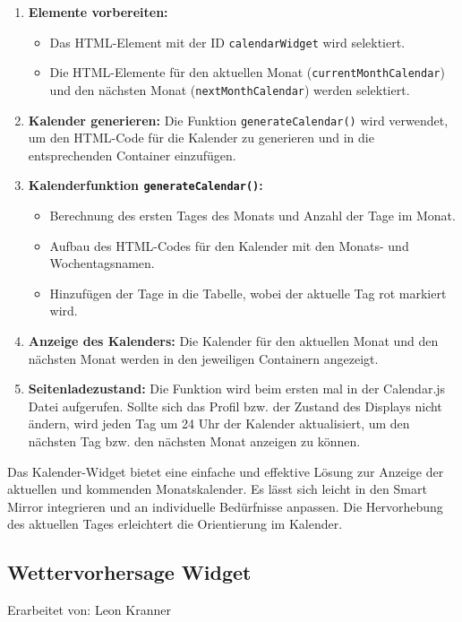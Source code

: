 \begin{enumerate}
    \item \textbf{Elemente vorbereiten:}
    \begin{itemize}
        \item Das HTML-Element mit der ID \texttt{calendarWidget} wird selektiert.
        \item Die HTML-Elemente für den aktuellen Monat (\texttt{currentMonthCalendar}) und den nächsten Monat (\texttt{nextMonthCalendar}) werden selektiert.
    \end{itemize}

    \item \textbf{Kalender generieren:}
    Die Funktion \texttt{generateCalendar()} wird verwendet, um den HTML-Code für die Kalender zu generieren und in die entsprechenden Container einzufügen.
    
    \item \textbf{Kalenderfunktion \texttt{generateCalendar()}:}
    \begin{itemize}
        \item Berechnung des ersten Tages des Monats und Anzahl der Tage im Monat.
        \item Aufbau des HTML-Codes für den Kalender mit den Monats- und Wochentagsnamen.
        \item Hinzufügen der Tage in die Tabelle, wobei der aktuelle Tag rot markiert wird.
    \end{itemize}

    \item \textbf{Anzeige des Kalenders:}
    Die Kalender für den aktuellen Monat und den nächsten Monat werden in den jeweiligen Containern angezeigt.

 \item \textbf{Seitenladezustand:}
    Die Funktion wird beim ersten mal in der Calendar.js Datei aufgerufen. Sollte sich das Profil bzw. der Zustand des Displays nicht ändern, wird jeden Tag um 24 Uhr der Kalender aktualisiert, um den nächsten Tag  bzw. den nächsten Monat anzeigen zu können.
\end{enumerate}

\noindent
Das Kalender-Widget bietet eine einfache und effektive Lösung zur Anzeige der aktuellen und kommenden Monatskalender. Es lässt sich leicht in den Smart Mirror integrieren und an individuelle Bedürfnisse anpassen. Die Hervorhebung des aktuellen Tages erleichtert die Orientierung im Kalender.


\subsection{Wettervorhersage Widget}
Erarbeitet von: Leon Kranner \\ \\

